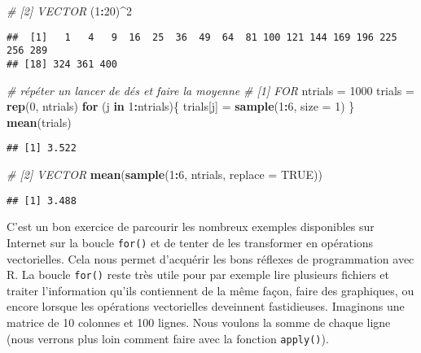 \documentclass[]{book}
\newenvironment{Shaded}{\begin{snugshade}}{\end{snugshade}}
\newcommand{\KeywordTok}[1]{\textcolor[rgb]{0.13,0.29,0.53}{\textbf{#1}}}
\newcommand{\DataTypeTok}[1]{\textcolor[rgb]{0.13,0.29,0.53}{#1}}
\newcommand{\DecValTok}[1]{\textcolor[rgb]{0.00,0.00,0.81}{#1}}
\newcommand{\StringTok}[1]{\textcolor[rgb]{0.31,0.60,0.02}{#1}}
\newcommand{\CommentTok}[1]{\textcolor[rgb]{0.56,0.35,0.01}{\textit{#1}}}
\newcommand{\OtherTok}[1]{\textcolor[rgb]{0.56,0.35,0.01}{#1}}
\newcommand{\ControlFlowTok}[1]{\textcolor[rgb]{0.13,0.29,0.53}{\textbf{#1}}}
\newcommand{\OperatorTok}[1]{\textcolor[rgb]{0.81,0.36,0.00}{\textbf{#1}}}
\newcommand{\NormalTok}[1]{#1}
\theoremstyle{definition}
\theoremstyle{definition}
\theoremstyle{definition}
\theoremstyle{remark}
\begin{document}
\begin{Shaded}
\begin{Highlighting}[]
\CommentTok{# [2] VECTOR}
\NormalTok{(}\DecValTok{1}\OperatorTok{:}\DecValTok{20}\NormalTok{)}\OperatorTok{^}\DecValTok{2}
\end{Highlighting}
\end{Shaded}

\begin{verbatim}
##  [1]   1   4   9  16  25  36  49  64  81 100 121 144 169 196 225 256 289
## [18] 324 361 400
\end{verbatim}

\begin{Shaded}
\begin{Highlighting}[]
\CommentTok{# répéter un lancer de dés et faire la moyenne}
\CommentTok{# [1] FOR}
\NormalTok{ntrials =}\StringTok{ }\DecValTok{1000}
\NormalTok{trials =}\StringTok{ }\KeywordTok{rep}\NormalTok{(}\DecValTok{0}\NormalTok{, ntrials)}
\ControlFlowTok{for}\NormalTok{ (j }\ControlFlowTok{in} \DecValTok{1}\OperatorTok{:}\NormalTok{ntrials)\{}
\NormalTok{  trials[j] =}\StringTok{ }\KeywordTok{sample}\NormalTok{(}\DecValTok{1}\OperatorTok{:}\DecValTok{6}\NormalTok{, }\DataTypeTok{size =} \DecValTok{1}\NormalTok{)}
\NormalTok{\}}
\KeywordTok{mean}\NormalTok{(trials)}
\end{Highlighting}
\end{Shaded}

\begin{verbatim}
## [1] 3.522
\end{verbatim}

\begin{Shaded}
\begin{Highlighting}[]
\CommentTok{# [2] VECTOR}
\KeywordTok{mean}\NormalTok{(}\KeywordTok{sample}\NormalTok{(}\DecValTok{1}\OperatorTok{:}\DecValTok{6}\NormalTok{, ntrials, }\DataTypeTok{replace =} \OtherTok{TRUE}\NormalTok{))}
\end{Highlighting}
\end{Shaded}

\begin{verbatim}
## [1] 3.488
\end{verbatim}

C'est un bon exercice de parcourir les nombreux exemples disponibles sur
Internet sur la boucle \texttt{for()} et de tenter de les transformer en
opérations vectorielles. Cela nous permet d'acquérir les bons réflexes
de programmation avec R. La boucle \texttt{for()} reste très utile pour
par exemple lire plusieurs fichiers et traiter l'information qu'ils
contiennent de la même façon, faire des graphiques, ou encore lorsque
les opérations vectorielles deveinnent fastidieuses. Imaginons une
matrice de 10 colonnes et 100 lignes. Nous voulons la somme de chaque
ligne (nous verrons plus loin comment faire avec la fonction
\texttt{apply()}).
\end{document}
